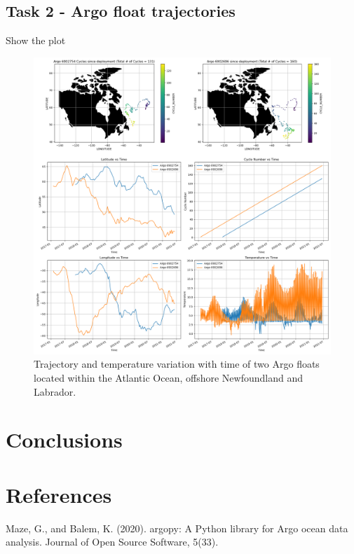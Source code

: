 \documentclass{article}
\begin{document}
\subsection{Task 2 - Argo float trajectories}

Show the plot

\begin{figure}[H]
\includegraphics[width=\textwidth,height=\textheight,keepaspectratio]{argo_trajectory.png}
\caption{Trajectory and temperature variation with time of two Argo floats located within the Atlantic Ocean, offshore Newfoundland and Labrador.}
\end{figure}
 
 

\section{Conclusions}

\section{References}

Maze, G., and Balem, K. (2020). argopy: A Python library for Argo ocean data analysis. Journal of Open Source Software, 5(33).
\end{document}
